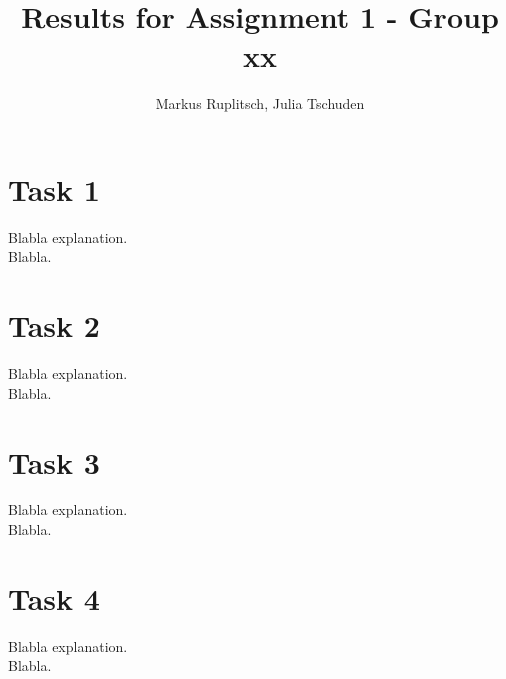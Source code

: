 \documentclass{article}
\title{\textbf{Results for Assignment 1 - Group xx}}
\author{Markus Ruplitsch, Julia Tschuden}
\begin{document}
\maketitle

\section{Task 1}
Blabla explanation.\\
Blabla.

\section{Task 2}
Blabla explanation.\\
Blabla.

\section{Task 3}
Blabla explanation.\\
Blabla.

\section{Task 4}
Blabla explanation.\\
Blabla.
\end{document}
